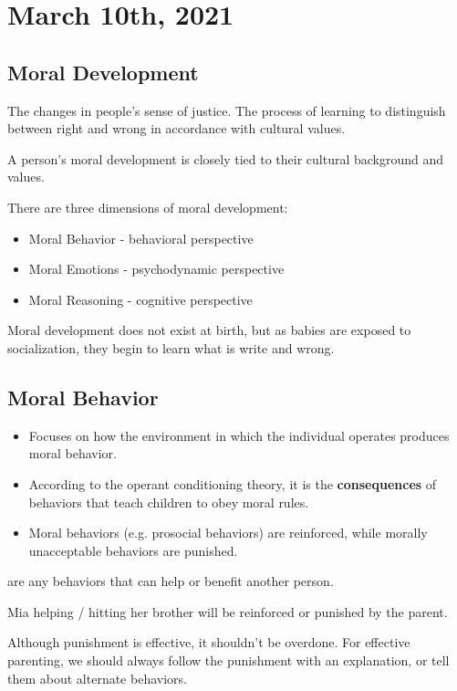 \documentclass[../main/main.tex]{subfiles}
\begin{document}
\section{March 10th, 2021}
\subsection{Moral Development}
\begin{definition}
  The changes in people's sense of justice. The process of learning to distinguish between right and wrong in accordance with cultural values.
\end{definition}
\begin{remark}
A person's moral development is closely tied to their cultural background and values.
\end{remark}
There are three dimensions of moral development:
\begin{itemize}
\item Moral Behavior - behavioral perspective
\item Moral Emotions - psychodynamic perspective
\item Moral Reasoning - cognitive perspective
\end{itemize}
Moral development does not exist at birth, but as babies are exposed to socialization, they begin to learn what is write and wrong.
\subsection{Moral Behavior}
\begin{itemize}
\item Focuses on how the environment in which the individual operates produces moral behavior.
  \item According to the operant conditioning theory, it is the \textbf{consequences} of behaviors that teach children to obey moral rules.
    \item Moral behaviors (e.g. prosocial behaviors) are reinforced, while morally unacceptable behaviors are punished.
\end{itemize}

\begin{definition}
 are any behaviors that can help or benefit another person.
\end{definition}
\begin{example}
Mia helping / hitting her brother will be reinforced or punished by the parent.
\end{example}
Although punishment is effective, it shouldn't be overdone.
For effective parenting, we should always follow the punishment with an explanation, or tell them about alternate behaviors.\\
\end{document}
